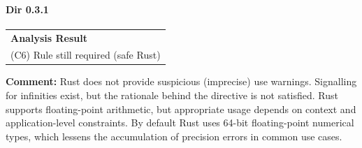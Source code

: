 \paragraph{Dir 0.3.1}
\begin{longtable}{p{13cm}}
\textbf{Analysis Result} \\
(C6) Rule still required (safe Rust) \\
\end{longtable}
\textbf{Comment:} Rust does not provide suspicious (imprecise) use warnings. Signalling for infinities exist, but the rationale behind the directive is not satisfied. Rust supports floating-point arithmetic, but appropriate usage depends on context and application-level constraints. By default Rust uses 64-bit floating-point numerical types, which lessens the accumulation of precision errors in common use cases. \\


